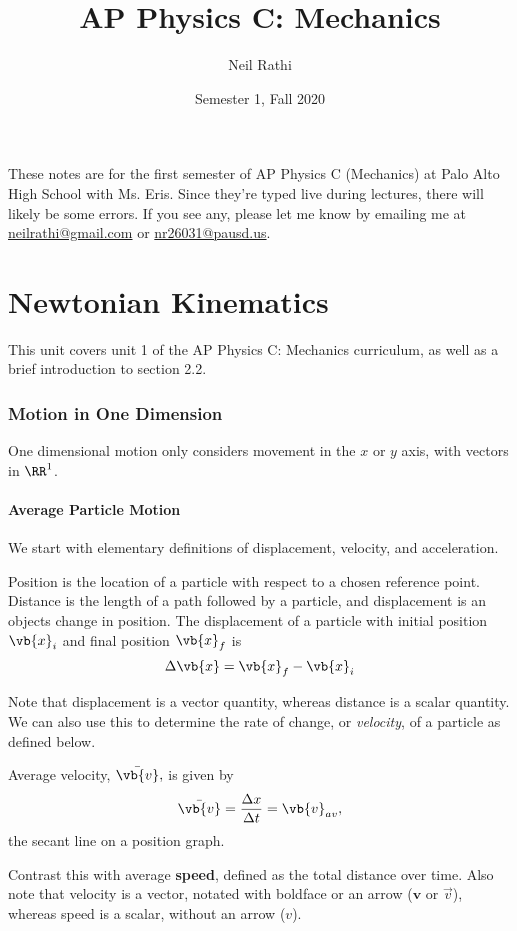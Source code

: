 \documentclass[11pt]{article}
\title{AP Physics C: Mechanics}
\author{Neil Rathi}
\date{Semester 1, Fall 2020}
\begin{document}
\maketitle
\noindent These notes are for the first semester of AP Physics C (Mechanics) at Palo Alto High School with Ms. Eris. Since they're typed live during lectures, there will likely be some errors. If you see any, please let me know by emailing me at \href{mailto:neilrathi@gmail.com}{neilrathi@gmail.com} or \href{mailto:neilrathi@gmail.com}{nr26031@pausd.us}.

\setcounter{tocdepth}{1}
\tableofcontents
\newpage

\part{Newtonian Kinematics}
This unit covers unit 1 of the AP Physics C: Mechanics curriculum, as well as a brief introduction to section 2.2.
\section{Motion in One Dimension}
One dimensional motion only considers movement in the $x$ or $y$ axis, with vectors in $\RR^1$.

\subsection{Average Particle Motion}
We start with elementary definitions of displacement, velocity, and acceleration.
\begin{defn}
	Position is the location of a particle with respect to a chosen reference point. Distance is the length of a path followed by a particle, and displacement is an objects change in position. The displacement of a particle with initial position $\vb{x}_i$ and final position $\vb{x}_f$ is
	\[\Delta \vb{x} = \vb{x}_f - \vb{x}_i\]
\end{defn}
Note that displacement is a vector quantity, whereas distance is a scalar quantity. We can also use this to determine the rate of change, or \textit{velocity}, of a particle as defined below.
\begin{defn}[Velocity]
	Average velocity, $\bar{\vb{v}},$ is given by
	\[\bar{\vb{v}} = \frac{\Delta x}{\Delta t} = \vb{v}_{av},\]
	the secant line on a position graph.
\end{defn}
Contrast this with average \textbf{speed}, defined as the total distance over time. Also note that velocity is a vector, notated with boldface or an arrow ($\mathbf{v}$ or $\vec{v}$), whereas speed is a scalar, without an arrow ($v$).
\end{document}

